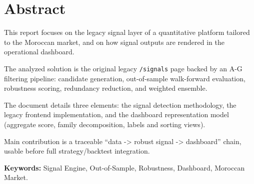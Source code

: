 \chapter*{Abstract}

This report focuses on the legacy signal layer of a quantitative platform
tailored to the Moroccan market, and on how signal outputs are rendered in the
operational dashboard.

The analyzed solution is the original legacy \texttt{/signals} page backed by an
A-G filtering pipeline: candidate generation, out-of-sample walk-forward
evaluation, robustness scoring, redundancy reduction, and weighted ensemble.

The document details three elements: the signal detection methodology, the
legacy frontend implementation, and the dashboard representation model
(aggregate score, family decomposition, labels and sorting views).

Main contribution is a traceable ``data -> robust signal -> dashboard'' chain,
usable before full strategy/backtest integration.

\textbf{Keywords:} Signal Engine, Out-of-Sample, Robustness, Dashboard,
Moroccan Market.

\cleardoublepage
